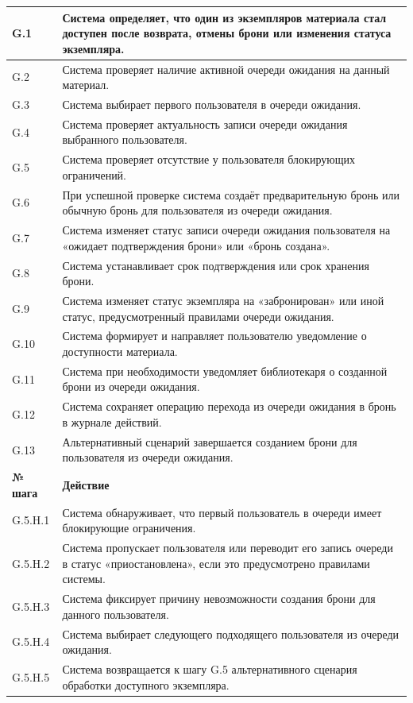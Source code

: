 \documentclass[12pt,a4paper]{article}
\begin{document}
\begin{xltabular}{\textwidth}{
				|>{\raggedright\arraybackslash}p{2.7cm}
				|>{\raggedright\arraybackslash}X|
			}
			G.1 & Система определяет, что один из экземпляров материала стал доступен
			после возврата, отмены брони или изменения статуса экземпляра. \\
			\hline
			G.2 & Система проверяет наличие активной очереди ожидания на данный
			материал. \\
			\hline
			G.3 & Система выбирает первого пользователя в очереди ожидания. \\
			\hline
			G.4 & Система проверяет актуальность записи очереди ожидания выбранного
			пользователя. \\
			\hline
			G.5 & Система проверяет отсутствие у пользователя блокирующих
			ограничений. \\
			\hline
			G.6 & При успешной проверке система создаёт предварительную бронь или
			обычную бронь для пользователя из очереди ожидания. \\
			\hline
			G.7 & Система изменяет статус записи очереди ожидания пользователя на
			«ожидает подтверждения брони» или «бронь создана». \\
			\hline
			G.8 & Система устанавливает срок подтверждения или срок хранения брони. \\
			\hline
			G.9 & Система изменяет статус экземпляра на «забронирован» или иной
			статус, предусмотренный правилами очереди ожидания. \\
			\hline
			G.10 & Система формирует и направляет пользователю уведомление о
			доступности материала. \\
			\hline
			G.11 & Система при необходимости уведомляет библиотекаря о созданной
			брони из очереди ожидания. \\
			\hline
			G.12 & Система сохраняет операцию перехода из очереди ожидания в бронь
			в журнале действий. \\
			\hline
			G.13 & Альтернативный сценарий завершается созданием брони для
			пользователя из очереди ожидания. \\
			\hline
			
			
			\textbf{№ шага} & \textbf{Действие} \\
			\hline
			
			G.5.H.1 & Система обнаруживает, что первый пользователь в очереди имеет
			блокирующие ограничения. \\
			\hline
			G.5.H.2 & Система пропускает пользователя или переводит его запись очереди
			в статус «приостановлена», если это предусмотрено правилами системы. \\
			\hline
			G.5.H.3 & Система фиксирует причину невозможности создания брони для
			данного пользователя. \\
			\hline
			G.5.H.4 & Система выбирает следующего подходящего пользователя из очереди
			ожидания. \\
			\hline
			G.5.H.5 & Система возвращается к шагу G.5 альтернативного сценария обработки
			доступного экземпляра. \\
			\hline
			

\end{xltabular}
\end{document}

